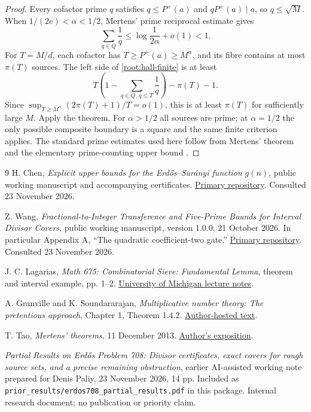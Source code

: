 \documentclass[11pt,a4paper]{article}
\theoremstyle{remark}
\begin{document}
\begin{proof}
Every cofactor prime \(q\) satisfies \(q\le P^+(a)\) and
\(qP^+(a)\mid a\), so \(q\le\sqrt M\). When
\(1/(2e)<\alpha<1/2\), Mertens' prime reciprocal estimate gives
\[
 \sum_{q\in Q}\frac1q
 \le\log\frac1{2\alpha}+o(1)<1.
\]
For \(T=M/d\), each cofactor has \(T\ge P^+(a)\ge M^\alpha\), and
its fibre contains at most \(\pi(T)\) sources. The left side of
\eqref{root:hall-finite} is at least
\[
 T\left(1-\sum_{q\in Q,\,q\le T}\frac1q\right)-\pi(T)-1.
\]
Since \(\sup_{T\ge M^\alpha}(2\pi(T)+1)/T=o(1)\), this is at
least \(\pi(T)\) for sufficiently large \(M\). Apply the theorem.
For \(\alpha>1/2\) all sources are prime; at \(\alpha=1/2\) the
only possible composite boundary is a square and the same finite
criterion applies. The standard prime estimates used here follow
from Mertens' theorem and the elementary prime-counting upper bound
\cite{TaoMertens}.
\end{proof}






\clearpage
\begin{thebibliography}{9}
H. Chen, \emph{Explicit upper bounds for the Erd\H{o}s--Sur\'anyi
function \(g(n)\)}, public working manuscript and accompanying
certificates. \href{https://github.com/chy4pro/erdos-708-explicit-upper-bounds}{Primary repository}.
Consulted 23 November 2026.

Z. Wang, \emph{Fractional-to-Integer Transference and Five-Prime
Bounds for Interval Divisor Covers}, public working manuscript,
version 1.0.0, 21 October 2026. In particular Appendix A,
``The quadratic coefficient-two gate.''
\href{https://github.com/science-prince/erdos-708-interval-divisor-covers}{Primary repository}.
Consulted 23 November 2026.

J. C. Lagarias, \emph{Math 675: Combinatorial Sieve: Fundamental
Lemma}, theorem and interval example, pp. 1--2.
\href{https://websites.umich.edu/lagarias/675notes/Estimate5-2015.pdf}{University of Michigan lecture notes}.

A. Granville and K. Soundararajan, \emph{Multiplicative number
theory: The pretentious approach}, Chapter 1, Theorem 1.4.2.
\href{https://dms.umontreal.ca/~andrew/PDF/Book.To1.4.pdf}{Author-hosted text}.

T. Tao, \emph{Mertens' theorems}, 11 December 2013.
\href{https://terrytao.wordpress.com/2013/12/11/mertens-theorems/}{Author's exposition}.

\emph{Partial Results on Erd\H{o}s Problem 708: Divisor
certificates, exact covers for rough source sets, and a precise
remaining obstruction}, earlier AI-assisted working note prepared
for Denis Paliy, 23 November 2026, 14 pp. Included as
\texttt{prior\_results/erdos708\_partial\_results.pdf} in this package.
Internal research document; no publication or priority claim.
\end{thebibliography}
\end{document}
